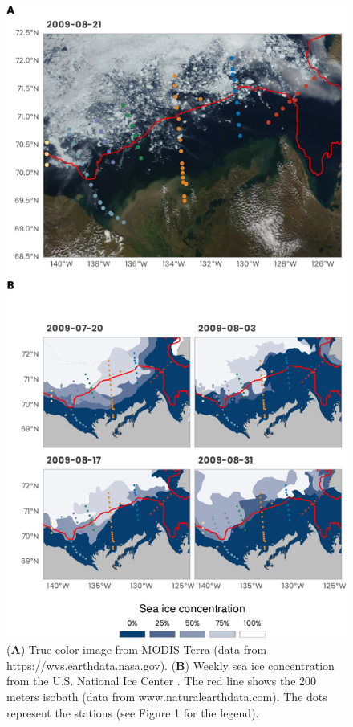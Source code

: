 \documentclass[essd, manuscript]{copernicus}
\begin{document}
\clearpage

\begin{figure}[H]
    \centering
    \includegraphics[scale = 0.75]{../../../graphs/fig02.pdf}
    \caption{(\textbf{A}) True color image from MODIS Terra (data from https://wvs.earthdata.nasa.gov). (\textbf{B}) Weekly sea ice concentration from the U.S. National Ice Center \citep{NSIDCG10033}. The red line shows the 200 meters isobath (data from www.naturalearthdata.com). The dots represent the stations (see Figure 1 for the legend).}
\end{figure}
\end{document}
